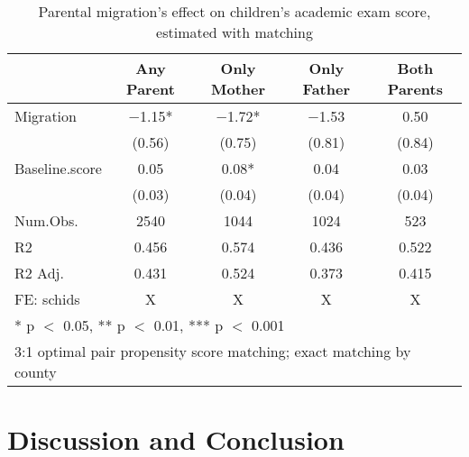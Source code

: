 \documentclass[
  man,floatsintext]{apa7}
\begin{document}
\newpage

\begin{table}

\caption{Parental migration’s effect on children’s academic exam score, estimated with matching}
\centering
\begin{tabular}[t]{lcccc}
\toprule
  & Any Parent & Only Mother & Only Father & Both Parents\\
\midrule
Migration & \num{-1.15}* & \num{-1.72}* & \num{-1.53} & \num{0.50}\\
 & (\num{0.56}) & (\num{0.75}) & (\num{0.81}) & (\num{0.84})\\
Baseline.score & \num{0.05} & \num{0.08}* & \num{0.04} & \num{0.03}\\
 & (\num{0.03}) & (\num{0.04}) & (\num{0.04}) & (\num{0.04})\\
\midrule
Num.Obs. & \num{2540} & \num{1044} & \num{1024} & \num{523}\\
R2 & \num{0.456} & \num{0.574} & \num{0.436} & \num{0.522}\\
R2 Adj. & \num{0.431} & \num{0.524} & \num{0.373} & \num{0.415}\\
FE: schids & X & X & X & X\\
\bottomrule
\multicolumn{5}{l}{\rule{0pt}{1em}* p $<$ 0.05, ** p $<$ 0.01, *** p $<$ 0.001}\\
\multicolumn{5}{l}{\rule{0pt}{1em}3:1 optimal pair propensity score matching; exact matching by county}\\
\end{tabular}
\end{table}

\newpage

\hypertarget{discussion-and-conclusion}{%
\section{Discussion and Conclusion}\label{discussion-and-conclusion}}
\end{document}
